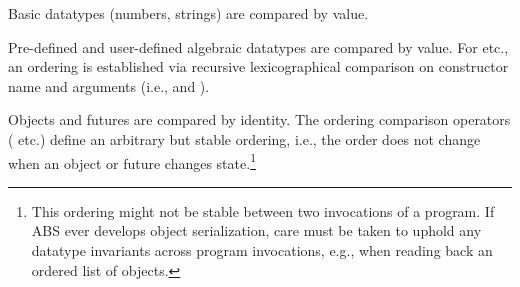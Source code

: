 Basic datatypes (numbers, strings) are compared by value.

Pre-defined and user-defined algebraic datatypes are compared by value.
For \absinline{<} etc., an ordering is established via recursive
lexicographical comparison on constructor name and arguments (i.e.,
 and ).

Objects and futures are compared by identity.  The ordering comparison
operators (\absinline{<} etc.) define an arbitrary but stable ordering,
i.e., the order does not change when an object or future changes
state.\footnote{This ordering might not be stable between two
  invocations of a program.  If ABS ever develops object serialization,
  care must be taken to uphold any datatype invariants across program
  invocations, e.g., when reading back an ordered list of objects.}







